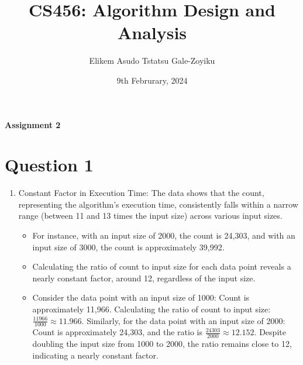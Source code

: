 \documentclass{article}
\title{\textbf{CS456: Algorithm Design and Analysis}}
\author{Elikem Asudo Tstatsu Gale-Zoyiku}
\date{9th Februrary, 2024}
\begin{document}
\maketitle
\begin{center}
    \begin{large}
        \textbf{Assignment 2\\}
    \end{large}
\end{center}
\newpage
\section*{Question 1}
\begin{enumerate}
    \item Constant Factor in Execution Time:
          The data shows that the count, representing the algorithm's execution time, consistently falls within a narrow range (between 11 and 13 times the input size) across various input sizes.
          \begin{itemize}
              \item For instance, with an input size of 2000, the count is 24,303, and with an input size of 3000, the count is approximately 39,992.
              \item Calculating the ratio of count to input size for each data point reveals a nearly constant factor, around 12, regardless of the input size.
              \item Consider the data point with an input size of 1000: Count is approximately 11,966.
                    Calculating the ratio of count to input size: \( \frac{11966}{1000} \approx 11.966 \).
                    Similarly, for the data point with an input size of 2000: Count is approximately 24,303, and the ratio is \( \frac{24303}{2000} \approx 12.152 \).
                    Despite doubling the input size from 1000 to 2000, the ratio remains close to 12, indicating a nearly constant factor.
          \end{itemize}


\end{enumerate}
\end{document}
